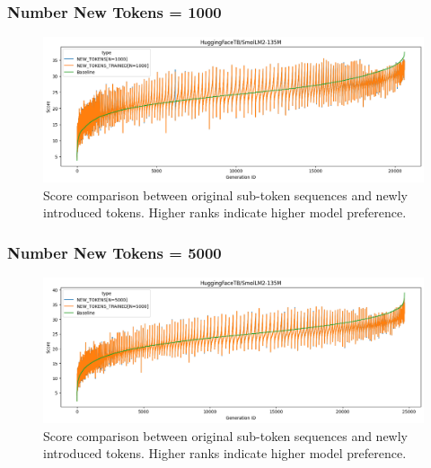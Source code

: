 \subsubsection*{Number New Tokens = 1000}
\begin{figure}[H]
    \centering
    \includegraphics[width=\textwidth]{Figures/Appendix/token-rank-comparison_1000_smol135M.png}
    \caption{Score comparison between original sub-token sequences and newly introduced tokens. Higher ranks indicate higher model preference.}
    \label{fig:new_token_rank:1000_smol135M}
\end{figure}
\FloatBarrier
\subsubsection*{Number New Tokens = 5000}
\begin{figure}[H]
    \centering
    \includegraphics[width=\textwidth]{Figures/Appendix/token-rank-comparison_5000_smol135M.png}
    \caption{Score comparison between original sub-token sequences and newly introduced tokens. Higher ranks indicate higher model preference.}
    \label{fig:new_token_rank:5000_smol135M}
\end{figure}
\FloatBarrier
